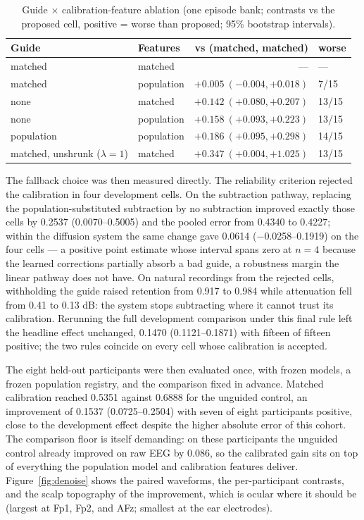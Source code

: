 \begin{table}[t]
\caption{Guide $\times$ calibration-feature ablation (one episode bank; contrasts vs the proposed cell, positive = worse than proposed; 95\% bootstrap intervals).}
\label{tab:matrix}
\centering
\small
\begin{tabular}{@{}llrl@{}}
\toprule
Guide & Features & vs (matched, matched) & worse \\
\midrule
matched & matched & --- & --- \\
matched & population & $+0.005\ (-0.004, +0.018)$ & 7/15 \\
none & matched & $+0.142\ (+0.080, +0.207)$ & 13/15 \\
none & population & $+0.158\ (+0.093, +0.223)$ & 13/15 \\
population & population & $+0.186\ (+0.095, +0.298)$ & 14/15 \\
matched, unshrunk ($\lambda{=}1$) & matched & $+0.347\ (+0.004, +1.025)$ & 13/15 \\
\bottomrule
\end{tabular}
\end{table}

The fallback choice was then measured directly. The reliability criterion rejected the calibration in four development cells. On the subtraction pathway, replacing the population-substituted subtraction by no subtraction improved exactly those cells by 0.2537 (0.0070--0.5005) and the pooled error from 0.4340 to 0.4227; within the diffusion system the same change gave 0.0614 ($-$0.0258--0.1919) on the four cells --- a positive point estimate whose interval spans zero at $n=4$ because the learned corrections partially absorb a bad guide, a robustness margin the linear pathway does not have. On natural recordings from the rejected cells, withholding the guide raised retention from 0.917 to 0.984 while attenuation fell from 0.41 to 0.13 dB: the system stops subtracting where it cannot trust its calibration. Rerunning the full development comparison under this final rule left the headline effect unchanged, 0.1470 (0.1121--0.1871) with fifteen of fifteen positive; the two rules coincide on every cell whose calibration is accepted.

The eight held-out participants were then evaluated once, with frozen models, a frozen population registry, and the comparison fixed in advance. Matched calibration reached 0.5351 against 0.6888 for the unguided control, an improvement of 0.1537 (0.0725--0.2504) with seven of eight participants positive, close to the development effect despite the higher absolute error of this cohort. The comparison floor is itself demanding: on these participants the unguided control already improved on raw EEG by 0.086, so the calibrated gain sits on top of everything the population model and calibration features deliver. Figure~\ref{fig:denoise} shows the paired waveforms, the per-participant contrasts, and the scalp topography of the improvement, which is ocular where it should be (largest at Fp1, Fp2, and AFz; smallest at the ear electrodes).

